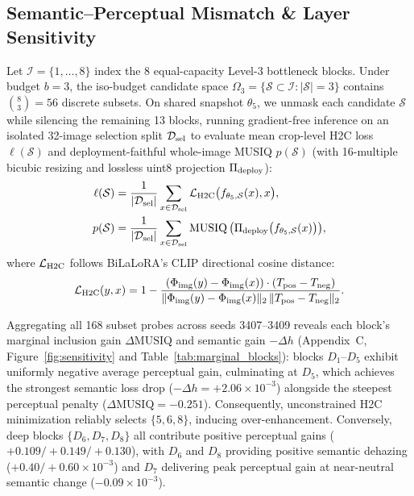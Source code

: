 \documentclass[10pt,twocolumn,letterpaper]{article}
\begin{document}
\subsection{Semantic--Perceptual Mismatch \& Layer Sensitivity}
Let $\mathcal{I}=\{1,\ldots,8\}$ index the 8 equal-capacity Level-3 bottleneck blocks. Under budget $b=3$, the iso-budget candidate space $\Omega_3=\{\mathcal{S}\subset\mathcal{I}:|\mathcal{S}|=3\}$ contains $\binom{8}{3}=56$ discrete subsets. On shared snapshot $\theta_5$, we unmask each candidate $\mathcal{S}$ while silencing the remaining 13 blocks, running gradient-free inference on an isolated 32-image selection split $\mathcal{D}_{\rm sel}$ to evaluate mean crop-level H2C loss $\ell(\mathcal{S})$ and deployment-faithful whole-image MUSIQ $p(\mathcal{S})$ (with 16-multiple bicubic resizing and lossless uint8 projection $\Pi_{\rm deploy}$):
\begin{align}
\ell(\mathcal{S})&=\frac{1}{|\mathcal{D}_{\rm sel}|}\sum_{x\in\mathcal{D}_{\rm sel}}\mathcal{L}_{\rm H2C}\big(f_{\theta_5,\mathcal{S}}(x),x\big), \nonumber\\
p(\mathcal{S})&=\frac{1}{|\mathcal{D}_{\rm sel}|}\sum_{x\in\mathcal{D}_{\rm sel}}\operatorname{MUSIQ}\big(\Pi_{\rm deploy}\big(f_{\theta_5,\mathcal{S}}(x)\big)\big),
\label{eq:probe}
\end{align}
where $\mathcal{L}_{\rm H2C}$ follows BiLaLoRA's CLIP directional cosine distance:
\begin{equation}
\mathcal{L}_{\rm H2C}(y,x)=1-\frac{(\Phi_{\rm img}(y)-\Phi_{\rm img}(x))\cdot(T_{\rm pos}-T_{\rm neg})}{\|\Phi_{\rm img}(y)-\Phi_{\rm img}(x)\|_2\,\|T_{\rm pos}-T_{\rm neg}\|_2}.
\label{eq:h2c}
\end{equation}

Aggregating all 168 subset probes across seeds 3407--3409 reveals each block's marginal inclusion gain $\Delta\mathrm{MUSIQ}$ and semantic gain $-\Delta h$ (Appendix~C, Figure~\ref{fig:sensitivity} and Table~\ref{tab:marginal_blocks}): blocks $D_1$--$D_5$ exhibit uniformly negative average perceptual gain, culminating at $D_5$, which achieves the strongest semantic loss drop ($-\Delta h=+2.06\times 10^{-3}$) alongside the steepest perceptual penalty ($\Delta\mathrm{MUSIQ}=-0.251$). Consequently, unconstrained H2C minimization reliably selects $\{5,6,8\}$, inducing over-enhancement. Conversely, deep blocks $\{D_6,D_7,D_8\}$ all contribute positive perceptual gains ($+0.109/+0.149/+0.130$), with $D_6$ and $D_8$ providing positive semantic dehazing ($+0.40/+0.60\times 10^{-3}$) and $D_7$ delivering peak perceptual gain at near-neutral semantic change ($-0.09\times 10^{-3}$).
\end{document}
